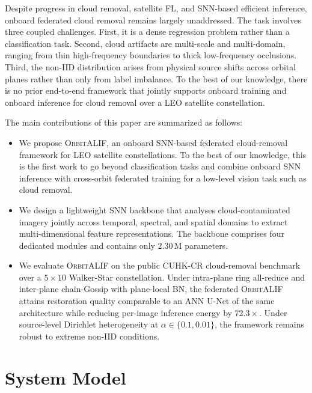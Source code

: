\documentclass[conference]{IEEEtran}
\newcommand{\OrbitALIF}{\textsc{OrbitALIF}}
\begin{document}
Despite progress in cloud removal, satellite FL, and SNN-based
efficient inference, onboard federated cloud removal remains largely
unaddressed. The task involves three coupled challenges. First, it is
a dense regression problem rather than a
classification task. Second, cloud artifacts are multi-scale and
multi-domain, ranging from thin high-frequency boundaries to thick
low-frequency occlusions. Third, the non-IID distribution arises from
physical source shifts across orbital planes rather than only from
label imbalance.  To the best of our knowledge,
there is no prior end-to-end framework that jointly supports onboard
training and onboard inference for  cloud removal over a LEO
satellite constellation.

%
The main contributions of this paper are summarized as follows:

\begin{itemize}

\item We propose \OrbitALIF{}, an onboard SNN-based federated
cloud-removal framework for LEO satellite constellations. To the best
of our knowledge, this is the first work to go beyond classification
tasks and combine onboard SNN inference with cross-orbit federated
training for a low-level vision task such as cloud removal. 

\item We design a lightweight SNN backbone that analyses
cloud-contaminated imagery jointly across temporal, spectral, and
spatial domains to extract multi-dimensional feature representations.
The backbone comprises four dedicated modules and contains only
$2.30$\,M parameters.

\item We evaluate \OrbitALIF{} on the public CUHK-CR cloud-removal
benchmark over a $5{\times}10$ Walker-Star constellation. Under
intra-plane ring all-reduce and inter-plane chain-Gossip with
plane-local BN, the federated \OrbitALIF{} attains restoration
quality comparable to an ANN U-Net of the same architecture while
reducing per-image inference energy by $72.3\times$. Under
source-level Dirichlet heterogeneity at $\alpha\!\in\!\{0.1,0.01\}$,
the framework remains robust to extreme non-IID conditions.
\end{itemize}



\section{System Model}\label{sec:sysmodel}
\end{document}
